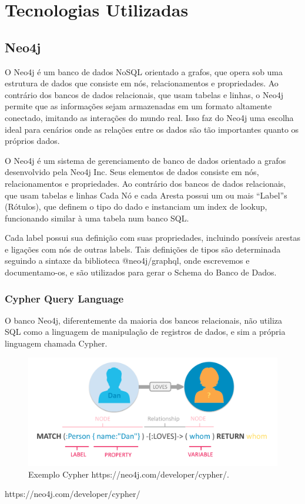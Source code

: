 \chapter{Tecnologias Utilizadas}
\label{chap3}

\section{Neo4j}
O Neo4j é um banco de dados NoSQL orientado a grafos, que opera sob uma estrutura de dados que consiste em nós, relacionamentos e propriedades. Ao contrário dos bancos de dados relacionais, que usam tabelas e linhas, o Neo4j permite que as informações sejam armazenadas em um formato altamente conectado, imitando as interações do mundo real. Isso faz do Neo4j uma escolha ideal para cenários onde as relações entre os dados são tão importantes quanto os próprios dados.

O Neo4j é um sistema de gerenciamento de banco de dados orientado a grafos desenvolvido pela Neo4j Inc. Seus elementos de dados consiste em nós, relacionamentos e propriedades. Ao contrário dos bancos de dados relacionais, que usam tabelas e linhas
Cada Nó e cada Aresta possui um ou mais “Label”s (Rótulos), que definem o tipo do dado e instanciam um index de lookup, funcionando similar à uma tabela num banco SQL.

Cada label possui sua definição com suas propriedades, incluindo possíveis arestas e ligações com nós de outras labels. Tais definições de tipos são determinada seguindo a sintaxe da biblioteca @neo4j/graphql, onde escrevemos e documentamo-os, e são utilizados para gerar o Schema do Banco de Dados.


\subsection{Cypher Query Language}

O banco Neo4j, diferentemente da maioria dos bancos relacionais, não utiliza SQL como a linguagem de manipulação de registros de dados, e sim a própria linguagem chamada Cypher.

\begin{figure}[H]
    \centering
    \includegraphics[width=1.0\linewidth]{Imagens/chap03/cypher-exemple.png}
    \caption{Exemplo Cypher https://neo4j.com/developer/cypher/.}
    \label{fig:profile-exemple}
\end{figure}
https://neo4j.com/developer/cypher/

